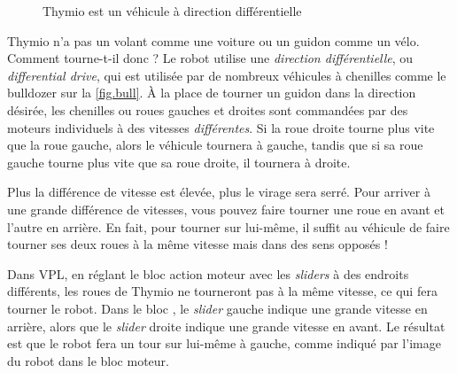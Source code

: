 \begin{figure}
	\hfill
	\caption{Thymio est un véhicule à direction différentielle}
\end{figure}



Thymio n'a pas un volant comme une voiture ou un guidon comme un vélo.
Comment tourne-t-il donc ? 
Le robot utilise une \emph{direction différentielle}, ou \emph{differential drive}, qui est  utilisée par de nombreux véhicules à chenilles comme le bulldozer sur la \cref{fig.bull}.
À la place de tourner un guidon dans la direction désirée, les chenilles ou roues gauches et droites sont commandées par des moteurs individuels à des vitesses \emph{différentes}.
Si la roue droite tourne plus vite que la roue gauche, alors le véhicule tournera à gauche, tandis que si sa roue gauche tourne plus vite que sa roue droite, il tournera à droite.

Plus la différence de vitesse est élevée, plus le virage sera serré.
Pour arriver à une grande différence de vitesses, vous pouvez faire tourner une roue en avant et l'autre en arrière.
En fait, pour tourner sur lui-même, il suffit au véhicule de faire tourner ses deux roues à la même vitesse mais dans des sens opposés !


Dans VPL, en réglant le bloc action moteur avec les \textit{sliders} à des endroits différents, les roues de Thymio ne tourneront pas à la même vitesse, ce qui fera tourner le robot.
Dans le bloc , le \textit{slider} gauche indique une grande vitesse en arrière, alors que le \textit{slider} droite indique une grande vitesse en avant.
Le résultat est que le robot fera un tour sur lui-même à gauche, comme indiqué par l'image du robot dans le bloc moteur.

